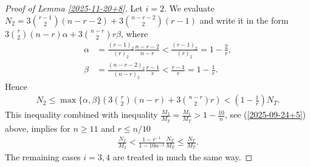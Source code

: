 \documentclass[11pt, a4paper]{article}
\begin{document}
\begin{proof}[Proof of Lemma \ref{2025-11-20+8}]
Let $i=2$.  
We evaluate
$
N_2
=
3\binom{r-1}{2}(n-r-2)
+
3\binom{n-r-2}{2}(r-1)
$ 
and write it in the form
$
3\binom{r}{2}(n-r)\alpha+3\binom{n-r}{2}r \beta$,
where
\begin{align*}
\alpha
&
=\frac{(r-1)_2}{(r)_2}\frac{n-r-2}{n-r}
<
\frac{(r-1)_2}{(r)_2}
=
1-\frac{2}{r},
\\
\beta
&
=\frac{(n-r-2)_2}{(n-r)_2}\frac{r-1}{r}
<\frac{r-1}{r}
=
1-\frac{1}{r}.
\end{align*}
Hence
\begin{align*}
N_2
\le 
\max\{\alpha,\beta\}
\left(3\binom{r}{2}(n-r)+3\binom{n-r}{2}r \right)
<
\left(1-\frac{1}{r}\right)
N_T.
\end{align*}
This inequality combined with inequality
$\frac{M_2}{M_T}
=
\frac{M_1}{M_T}
>
1-\frac{10}{n}
$, see (\ref{2025-09-24+5})
above, 
implies 
for $n\ge 11$ and 
$r\le n/10$
\begin{align*}
\frac{N_2}{M_2}
< 
\frac{1-r^{-1}}{1-10n^{-1}}\frac{N_T}{M_T}
\le 
\frac{N_T}{M_T}.
\end{align*}
The remaining cases $i=3,4$ are treated  in much the same 
way. 
\end{proof}
\end{document}
